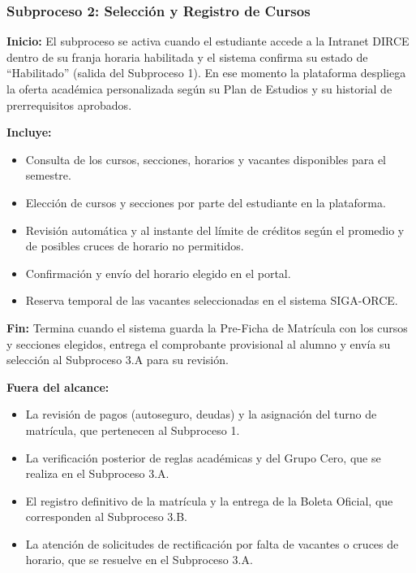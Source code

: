 \subsubsection{Subproceso 2: Selección y Registro de Cursos}



\textbf{Inicio:} El subproceso se activa cuando el estudiante accede a la Intranet DIRCE dentro de su franja horaria habilitada y el sistema confirma su estado de ``Habilitado'' (salida del Subproceso 1). En ese momento la plataforma despliega la oferta académica personalizada según su Plan de Estudios y su historial de prerrequisitos aprobados.

\textbf{Incluye:}
\begin{itemize}
    \item Consulta de los cursos, secciones, horarios y vacantes disponibles para el semestre.
    \item Elección de cursos y secciones por parte del estudiante en la plataforma.
    \item Revisión automática y al instante del límite de créditos según el promedio y de posibles cruces de horario no permitidos.
    \item Confirmación y envío del horario elegido en el portal.
    \item Reserva temporal de las vacantes seleccionadas en el sistema SIGA-ORCE.
\end{itemize}

\textbf{Fin:} Termina cuando el sistema guarda la Pre-Ficha de Matrícula con los cursos y secciones elegidos, entrega el comprobante provisional al alumno y envía su selección al Subproceso 3.A para su revisión.

\textbf{Fuera del alcance:}
\begin{itemize}
    \item La revisión de pagos (autoseguro, deudas) y la asignación del turno de matrícula, que pertenecen al Subproceso 1.
    \item La verificación posterior de reglas académicas y del Grupo Cero, que se realiza en el Subproceso 3.A.
    \item El registro definitivo de la matrícula y la entrega de la Boleta Oficial, que corresponden al Subproceso 3.B.
    \item La atención de solicitudes de rectificación por falta de vacantes o cruces de horario, que se resuelve en el Subproceso 3.A.
\end{itemize}

